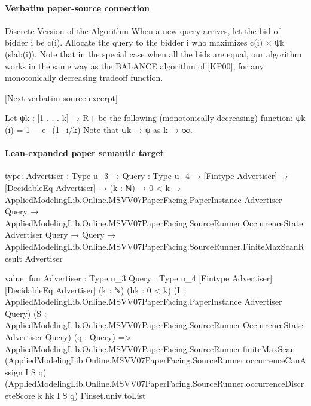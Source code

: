 \documentclass[10pt]{article}
\begin{document}
\paragraph{Verbatim paper-source connection}
\begin{ReviewVerbatim}
Discrete Version of the Algorithm
When a new query arrives, let the bid of bidder i be c(i). Allocate the query to the
bidder i who maximizes c(i) × ψk (slab(i)).
Note that in the special case when all the bids are equal, our algorithm works in the same way
as the BALANCE algorithm of [KP00], for any monotonically decreasing tradeoff function.

[Next verbatim source excerpt]

Let ψk : [1 . . . k] → R+ be the following (monotonically decreasing) function:
ψk (i) = 1 − e−(1−i/k)
Note that ψk → ψ as k → ∞.
\end{ReviewVerbatim}



\paragraph{Lean-expanded paper semantic target}
\begin{ReviewVerbatim}
type:
{Advertiser : Type u_3} →
  {Query : Type u_4} →
    [Fintype Advertiser] →
      [DecidableEq Advertiser] →
        (k : ℕ) →
          0 < k →
            AppliedModelingLib.Online.MSVV07PaperFacing.PaperInstance Advertiser Query →
              AppliedModelingLib.Online.MSVV07PaperFacing.SourceRunner.OccurrenceState Advertiser Query →
                Query → AppliedModelingLib.Online.MSVV07PaperFacing.SourceRunner.FiniteMaxScanResult Advertiser

value:
fun {Advertiser : Type u_3} {Query : Type u_4} [Fintype Advertiser] [DecidableEq Advertiser] (k : ℕ) (hk : 0 < k)
    (I : AppliedModelingLib.Online.MSVV07PaperFacing.PaperInstance Advertiser Query)
    (S : AppliedModelingLib.Online.MSVV07PaperFacing.SourceRunner.OccurrenceState Advertiser Query) (q : Query) =>
  AppliedModelingLib.Online.MSVV07PaperFacing.SourceRunner.finiteMaxScan
    (AppliedModelingLib.Online.MSVV07PaperFacing.SourceRunner.occurrenceCanAssign I S q)
    (AppliedModelingLib.Online.MSVV07PaperFacing.SourceRunner.occurrenceDiscreteScore k hk I S q) Finset.univ.toList
\end{ReviewVerbatim}
\end{document}
